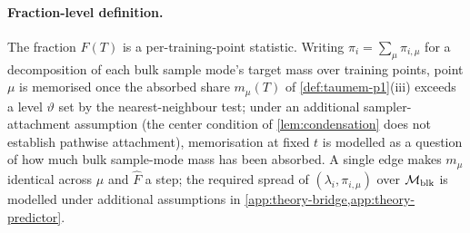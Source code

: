 \paragraph{Fraction-level definition.}
The fraction $F(T)$ is a per-training-point statistic. Writing $\pi_i=\sum_\mu\pi_{i,\mu}$ for a decomposition of each bulk sample mode's target mass over training points, point $\mu$ is memorised once the absorbed share $m_\mu(T)$ of \cref{def:taumem-p1}(iii) exceeds a level $\vartheta$ set by the nearest-neighbour test; under an additional sampler-attachment assumption (the center condition of \cref{lem:condensation} does not establish pathwise attachment), memorisation at fixed $t$ is modelled as a question of how much bulk sample-mode mass has been absorbed. A single edge makes $m_\mu$ identical across $\mu$ and $\hat F$ a step; the required spread of $(\lambda_i,\pi_{i,\mu})$ over $\mathcal M_{\rm blk}$ is modelled under additional assumptions in \cref{app:theory-bridge,app:theory-predictor}.

